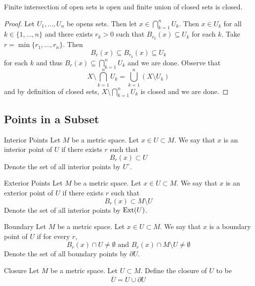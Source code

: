 \documentclass[a4paper]{article}
\begin{document}
\begin{prp}{}{} Finite intersection of open sets is open and finite union of closed sets is closed. \tcbline
\begin{proof}
Let $U_1,\dots,U_n$ be opens sets. Then let $x\in\bigcap_{k=1}^nU_k$. Then $x\in U_k$ for all $k\in\{1,\dots,n\}$ and there exists $r_k>0$ such that $B_{r_k}(x)\subseteq U_k$ for each $k$. Take $r=\min\{r_1,\dots,r_n\}$. Then $$B_r(x)\subseteq B_{r_k}(x)\subseteq U_k$$ for each $k$ and thus $B_r(x)\subseteq\bigcap_{k=1}^nU_k$ and we are done. \linebreak\linebreak
Observe that $$X\setminus\bigcap_{k=1}^nU_k=\bigcup_{k=1}^n(X\setminus U_k)$$ and by definition of closed sets, $X\setminus\bigcap_{k=1}^nU_k$ is closed and we are done. 
\end{proof}
\end{prp}

\subsection{Points in a Subset}
\begin{defn}{Interior Points}{} Let $M$ be a metric space. Let $x\in U\subset M$. We say that $x$ is an interior point of $U$ if there exists $r$ such that $$B_r(x)\subset U$$ Denote the set of all interior points by $U^\circ$. 
\end{defn}

\begin{defn}{Exterior Points}{} Let $M$ be a metric space. Let $x\in U\subset M$. We say that $x$ is an exterior point of $U$ if there exists $r$ such that $$B_r(x)\subset M\setminus U$$ Denote the set of all interior points by $\operatorname{Ext}(U)$. 
\end{defn}

\begin{defn}{Boundary}{} Let $M$ be a metric space. Let $x\in U\subset M$. We say that $x$ is a boundary point of $U$ if for every $r$, $$B_r(x)\cap U\neq\emptyset\text{ and }B_r(x)\cap M\setminus U\neq\emptyset$$ Denote the set of all boundary points by $\partial U$. 
\end{defn}

\begin{defn}{Closure}{} Let $M$ be a metric space. Let $U\subset M$. Define the closure of $U$ to be $$\overline{U}=U\cup\partial U$$
\end{defn}
\end{document}
